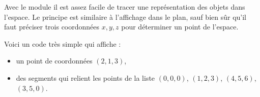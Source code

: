 \documentclass[11pt,class=report,crop=false]{standalone}
\begin{document}





\bigskip


\begin{cours}


Avec le module  il est assez facile de tracer une représentation des objets dans l'espace.
Le principe est similaire à l'affichage dans le plan, sauf bien sûr qu'il faut préciser trois coordonnées $x,y,z$ pour déterminer un point de l'espace.

\bigskip

Voici un code très simple qui affiche :
\begin{itemize}
	\item un point de coordonnées $(2,1,3)$,
	\item des segments qui relient les points de la liste  $(0,0,0)$, $(1,2,3)$, $(4,5,6)$, $(3,5,0)$.
\end{itemize}


\end{cours}
\end{document}
